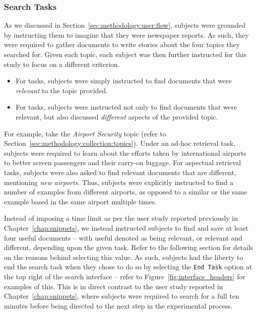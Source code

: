 \subsubsection{Search Tasks}\label{sec:diversity:users:method:tasks}
As we discussed in Section~\ref{sec:methodology:user:flow}, subjects were grounded by instructing them to imagine that they were newspaper reports. As such, they were required to gather documents to write stories about the four topics they searched for. Given each topic, each subject was then further instructed for this study to focus on a different criterion.

\begin{itemize}
    \item{For  tasks, subjects were simply instructed to find documents that were \emph{relevant} to the topic provided.}
    \item{For  tasks, subjects were instructed not only to find documents that were relevant, but also discussed \emph{different} aspects of the provided topic.}
\end{itemize}

For example, take the \emph{Airport Security} topic (refer to Section~\ref{sec:methodology:collection:topics}). Under an ad-hoc retrieval task, subjects were required to learn about the efforts taken by international airports to better screen passengers and their carry-on luggage. For aspectual retrieval tasks, subjects were also asked to find relevant documents that are different, mentioning \emph{new airports.} Thus, subjects were explicitly instructed to find a number of examples from different airports, as opposed to a similar or the same example based in the same airport multiple times.

Instead of imposing a time limit as per the user study reported previously in Chapter~\ref{chap:snippets}, we instead instructed subjects to find and save at least four useful documents -- with useful denoted as being relevant, or relevant and different, depending upon the given task. Refer to the following section for details on the reasons behind selecting this value. As such, subjects had the liberty to end the search task when they chose to do so by selecting the \texttt{End Task} option at the top right of the search interface -- refer to Figure~\ref{fig:interface_headers} for examples of this. This is in direct contrast to the user study reported in Chapter~\ref{chap:snippets}, where subjects were required to search for a full ten minutes before being directed to the next step in the experimental process.

